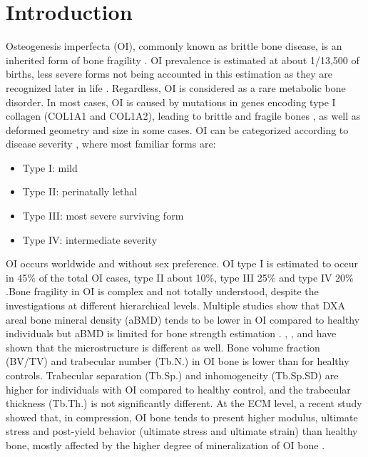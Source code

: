 \documentclass[a4paper,fleqn]{DC_ArtStyle}
\begin{document}
	\section{Introduction}
	
	Osteogenesis imperfecta (OI), commonly known as brittle bone disease, is an inherited form of bone fragility \cite{Tournis2018}. OI prevalence is estimated at about  1/13,500 of births, less severe forms not being accounted in this estimation as they are recognized later in life \cite{Lindahl2015}. Regardless, OI is considered as a rare metabolic bone disorder. In most cases, OI is caused by mutations in genes encoding type I collagen (COL1A1 and COL1A2), leading to brittle and fragile bones \cite{LIM2017}, as well as deformed geometry and size in some cases. OI can be categorized according to disease severity \cite{Mortier2019}, where most familiar forms are:
	\begin{itemize}
		\item Type I: mild
		\item Type II: perinatally lethal
		\item Type III: most severe surviving form
		\item Type IV: intermediate severity
	\end{itemize}
	
	OI occurs worldwide and without sex preference. OI type I is estimated to occur in 45\% of the total OI cases, type II about 10\%, type III 25\% and type IV 20\% \cite{Martin2007}.Bone fragility in OI is complex and not totally understood, despite the investigations at different hierarchical levels. Multiple studies show that DXA areal bone mineral density (aBMD) tends to be lower in OI compared to healthy individuals \cite{Folkestad2012,Lindahl2015,Scheres2018} but aBMD is limited for bone strength estimation \cite{Pasco2006}.  \citeauthor{Folkestad2012}\cite{Folkestad2012}, \citeauthor{Kocijan2015}\cite{Kocijan2015}, and \citeauthor{Rolvien2018}\cite{Rolvien2018} have shown that the microstructure is different as well. Bone volume fraction (BV/TV) and trabecular number (Tb.N.) in OI bone is lower than for healthy controls. Trabecular separation (Tb.Sp.) and inhomogeneity (Tb.Sp.SD) are higher for individuals with OI compared to healthy control, and the trabecular thickness (Tb.Th.) is not significantly different. At the ECM level, a recent study showed that, in compression, OI bone tends to present higher modulus, ultimate stress and post-yield behavior (ultimate stress and ultimate strain) than healthy bone, mostly affected by the higher degree of mineralization of OI bone \cite{Indermaur2021}.\\
	
\end{document}
